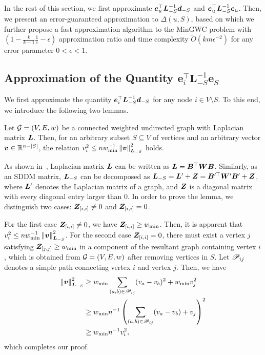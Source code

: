 \documentclass[10pt,twocolumn,twoside]{IEEEtran}
\begin{document}
In the rest of this section, we first approximate $\boldsymbol{e}_u^\top \boldsymbol{L}_{-S}^{-1} \boldsymbol{d}_{-S}$ and $\boldsymbol{e}_u^\top \boldsymbol{L}_{-S}^{-1}\boldsymbol{e}_u$. Then, we present an  error-guaranteed approximation to  \(\Delta(u,S)\), based on which we further propose  a fast approximation algorithm to the MinGWC problem  with $(1-\frac{k}{k-1} \frac{1}{e}-\epsilon)$ approximation ratio and time complexity $\tilde{O}(km\epsilon^{-2})$ for any error parameter $0< \epsilon < 1$.


\subsection{Approximation of the Quantity $\mathbf{e}_i^\top \mathbf{L}_{-S}^{-1}\mathbf{e}_S$}

We first  approximate the quantity \(\boldsymbol{e}_i^\top\boldsymbol{L}_{-S}^{-1}\boldsymbol{d}_{-S}\) for any node $i\in V\setminus S$. To this end, we introduce the following two lemmas.
\begin{lemma}\label{lem:norm-ineq}
    Let \(\mathcal{G}=(V,E,w)\) be a connected weighted undirected graph with Laplacian matrix  \(\boldsymbol{L}\). Then, for an arbitrary subset \(S\subseteq V\) of vertices and an arbitrary vector \(\boldsymbol{v}\in\mathbb{R}^{n-\left|S \right|}\), the relation \(v_i^2\le nw_{\min}^{-1}\left\Vert\boldsymbol{v}\right\Vert^2_{\boldsymbol{L}_{-S}}\) holds.
\end{lemma}
\begin{IEEEproof}
    As shown in~, Laplacian matrix $\boldsymbol{L}$ can be written as \(\boldsymbol{L}=\boldsymbol{B}^\top\boldsymbol{W}\boldsymbol{B}\).   Similarly, as an SDDM matrix, \(\boldsymbol{L}_{-S}\) can be decomposed as \(\boldsymbol{L}_{-S}=\boldsymbol{L}'+\boldsymbol{Z}=\boldsymbol{B}'^\top\boldsymbol{W}'\boldsymbol{B}'+\boldsymbol{Z}\), where \(\boldsymbol{L}'\) denotes the Laplacian matrix of a  graph, and \(\boldsymbol{Z}\) is a diagonal matrix with every diagonal entry  larger than 0. In order to prove the lemma, we distinguish two cases:  \(\boldsymbol{Z}_{[i,i]}\neq0\) and  \(\boldsymbol{Z}_{[i,i]}=0\).

    For the first case \(\boldsymbol{Z}_{[i,i]}\neq0\),  we have \(\boldsymbol{Z}_{[i,i]}\ge w_{\min}\). Then, it is apparent that \(v_i^2\le nw_{\min}^{-1}\left\Vert\boldsymbol{v}\right\Vert^2_{\boldsymbol{L}_{-S}}\). For the second case  \(\boldsymbol{Z}_{[i,i]}=0\), there must exist a vertex \(j\)  satisfying \(\boldsymbol{Z}_{[j,j]}\ge w_{\min}\) in a component of the resultant graph containing vertex \(i\), which is obtained from \(\mathcal{G}=(V,E,w)\) after removing vertices in \(S\).    Let \(\mathscr{P}_{ij}\) denotes a simple path connecting vertex \(i\) and vertex \(j\). Then, we have
    \begin{align*}
        \left\Vert\boldsymbol{v}\right\Vert^2_{\boldsymbol{L}_{-S}}
         & \ge w_{\min}\sum_{\left( a,b \right)\in\mathscr{P}_{ij}}(v_a-v_b)^2+w_{\min}v_j^2     \\
         & \ge w_{\min}n^{-1}\left( \sum_{\left( a,b \right)\in\mathscr{P}_{ij}}(v_a-v_b)+v_j \right)^2 \\
         & \ge w_{\min}n^{-1}v_i^2,
    \end{align*}
    which completes our proof.
\end{IEEEproof}
\end{document}
